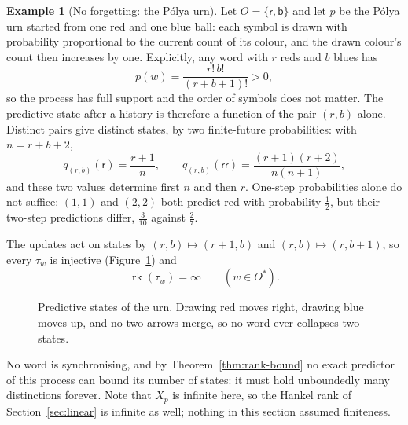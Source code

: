 \documentclass[10pt]{article}
\theoremstyle{definition}
\newtheorem{example}[theorem]{Example}
\theoremstyle{remark}
\newcommand{\rk}{\operatorname{rk}}
\newcommand{\Obs}{O}
\begin{document}
\begin{example}[No forgetting: the P\'olya urn]
\label{ex:polya}
Let $\Obs=\{\mathsf r,\mathsf b\}$ and let $p$ be the P\'olya urn started
from one red and one blue ball: each symbol is drawn with probability
proportional to the current count of its colour, and the drawn colour's
count then increases by one.  Explicitly, any word with $r$ reds and $b$
blues has
\[
  p(w)=\frac{r!\,b!}{(r+b+1)!}>0,
\]
so the process has full support and the order of symbols does not
matter.  The predictive state after a history is therefore a function of
the pair $(r,b)$ alone.  Distinct pairs give distinct states, by two
finite-future probabilities: with $n=r+b+2$,
\[
  q_{(r,b)}(\mathsf r)=\frac{r+1}{n},
  \qquad
  q_{(r,b)}(\mathsf r\mathsf r)=\frac{(r+1)(r+2)}{n(n+1)},
\]
and these two values determine first $n$ and then $r$.  One-step
probabilities alone do not suffice: $(1,1)$ and $(2,2)$ both predict
red with probability $\tfrac12$, but their two-step predictions
differ, $\tfrac{3}{10}$ against $\tfrac27$.

The updates act on states by
$(r,b)\mapsto(r+1,b)$ and $(r,b)\mapsto(r,b+1)$, so every $\tau_w$ is
injective (Figure~\ref{fig:urn}) and
\[
  \rk(\tau_w)=\infty
  \qquad(w\in\Obs^*).
\]
\begin{figure}[ht]
\centering
{}
\caption{Predictive states of the urn.  Drawing red moves right,
drawing blue moves up, and no two arrows merge, so no word ever collapses
two states.}
\label{fig:urn}
\end{figure}

No word is synchronising, and by
Theorem~\ref{thm:rank-bound} no exact predictor of this process can
bound its number of states: it must hold unboundedly many distinctions
forever.  Note that $X_p$ is infinite here, so the Hankel rank of
Section~\ref{sec:linear} is infinite as well; nothing in this section
assumed finiteness.
\end{example}
\end{document}
